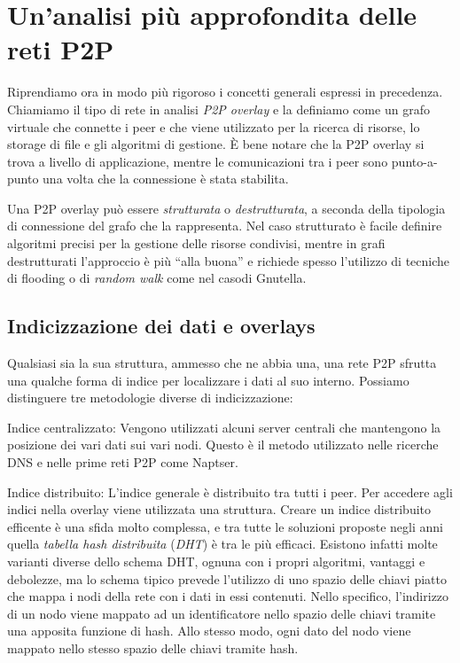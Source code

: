 \chapter{Un'analisi più approfondita delle reti P2P}\label{unanalisi-piuxf9-approfondita-delle-reti-p2p}


Riprendiamo ora in modo più rigoroso i concetti generali espressi in precedenza. Chiamiamo il tipo di rete in analisi \emph{P2P overlay} e la definiamo come un grafo virtuale che connette i peer e che viene utilizzato per la ricerca di risorse, lo storage di file e gli algoritmi di gestione. È bene notare che la P2P overlay si trova a livello di applicazione, mentre le comunicazioni tra i peer sono punto-a-punto una volta che la connessione è stata stabilita.

Una P2P overlay può essere \emph{strutturata} o \emph{destrutturata}, a seconda della tipologia di connessione del grafo che la rappresenta. Nel caso strutturato è facile definire algoritmi precisi per la gestione delle risorse condivisi, mentre in grafi destrutturati l'approccio è più ``alla buona'' e richiede spesso l'utilizzo di tecniche di flooding o di \emph{random walk} come nel casodi Gnutella.

\section{Indicizzazione dei dati e overlays}\label{indicizzazione-dei-dati-e-overlays}

Qualsiasi sia la sua struttura, ammesso che ne abbia una, una rete P2P sfrutta una qualche forma di indice per localizzare i dati al suo interno. Possiamo distinguere tre metodologie diverse di indicizzazione:

Indice centralizzato: Vengono utilizzati alcuni server centrali che mantengono la posizione dei vari dati sui vari nodi. Questo è il metodo utilizzato nelle ricerche DNS e nelle prime reti P2P come Naptser.

Indice distribuito: L'indice generale è distribuito tra tutti i peer. Per accedere agli indici nella overlay viene utilizzata una struttura. Creare un indice distribuito efficente è una sfida molto complessa, e tra tutte le soluzioni proposte negli anni quella \emph{tabella hash distribuita} (\emph{DHT}) è tra le più efficaci. Esistono infatti molte varianti diverse dello schema DHT, ognuna con i propri algoritmi, vantaggi e debolezze, ma lo schema tipico prevede l'utilizzo di uno spazio delle chiavi piatto che mappa i nodi della rete con i dati in essi contenuti.
Nello specifico, l'indirizzo di un nodo viene mappato ad un identificatore nello spazio delle chiavi tramite una apposita funzione di hash. Allo stesso modo, ogni dato del nodo viene mappato nello stesso spazio delle chiavi tramite hash.

